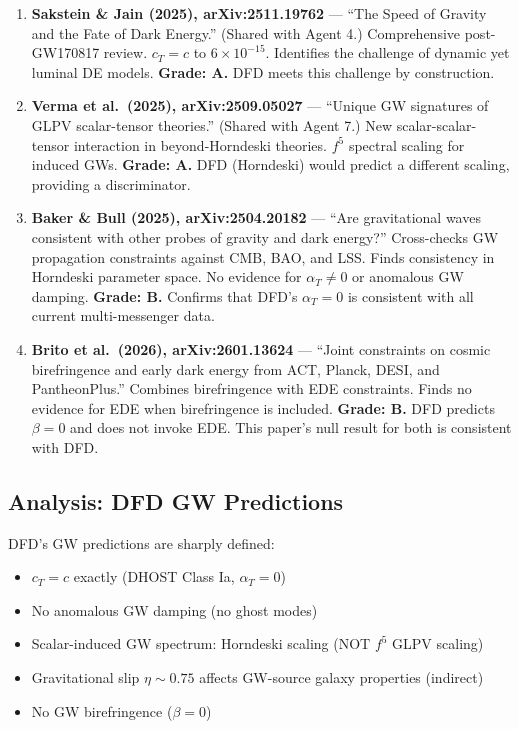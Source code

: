 \documentclass[11pt,a4paper]{article}
\begin{document}
\begin{enumerate}

\item \textbf{Sakstein \& Jain (2025), arXiv:2511.19762} --- ``The Speed of Gravity and the Fate of Dark Energy.'' (Shared with Agent 4.) Comprehensive post-GW170817 review. $c_T = c$ to $6 \times 10^{-15}$. Identifies the challenge of dynamic yet luminal DE models. \textbf{Grade: A.} DFD meets this challenge by construction.

\item \textbf{Verma et al.\ (2025), arXiv:2509.05027} --- ``Unique GW signatures of GLPV scalar-tensor theories.'' (Shared with Agent 7.) New scalar-scalar-tensor interaction in beyond-Horndeski theories. $f^5$ spectral scaling for induced GWs. \textbf{Grade: A.} DFD (Horndeski) would predict a different scaling, providing a discriminator.

\item \textbf{Baker \& Bull (2025), arXiv:2504.20182} --- ``Are gravitational waves consistent with other probes of gravity and dark energy?'' Cross-checks GW propagation constraints against CMB, BAO, and LSS. Finds consistency in Horndeski parameter space. No evidence for $\alpha_T \neq 0$ or anomalous GW damping. \textbf{Grade: B.} Confirms that DFD's $\alpha_T = 0$ is consistent with all current multi-messenger data.

\item \textbf{Brito et al.\ (2026), arXiv:2601.13624} --- ``Joint constraints on cosmic birefringence and early dark energy from ACT, Planck, DESI, and PantheonPlus.'' Combines birefringence with EDE constraints. Finds no evidence for EDE when birefringence is included. \textbf{Grade: B.} DFD predicts $\beta = 0$ and does not invoke EDE. This paper's null result for both is consistent with DFD.

\end{enumerate}

\subsection{Analysis: DFD GW Predictions}

DFD's GW predictions are sharply defined:
\begin{itemize}
\item $c_T = c$ exactly (DHOST Class Ia, $\alpha_T = 0$)
\item No anomalous GW damping (no ghost modes)
\item Scalar-induced GW spectrum: Horndeski scaling (NOT $f^5$ GLPV scaling)
\item Gravitational slip $\eta \sim 0.75$ affects GW-source galaxy properties (indirect)
\item No GW birefringence ($\beta = 0$)
\end{itemize}
\end{document}
